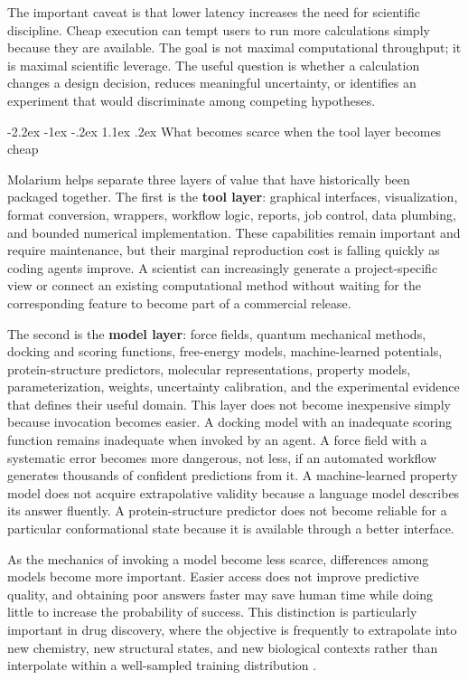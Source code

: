 \documentclass[11pt]{article}
\makeatletter
\renewcommand\section{\@startsection{section}{1}{\z@}%
  {-2.2ex \@plus -1ex \@minus -.2ex}%
  {1.1ex \@plus .2ex}%
  {\normalfont\Large\bfseries\color{molblue}}}
\makeatother
\begin{document}
The important caveat is that lower latency increases the need for scientific discipline. Cheap execution can tempt users to run more calculations simply because they are available. The goal is not maximal computational throughput; it is maximal scientific leverage. The useful question is whether a calculation changes a design decision, reduces meaningful uncertainty, or identifies an experiment that would discriminate among competing hypotheses.

\section{What becomes scarce when the tool layer becomes cheap}

Molarium helps separate three layers of value that have historically been packaged together. The first is the \textbf{tool layer}: graphical interfaces, visualization, format conversion, wrappers, workflow logic, reports, job control, data plumbing, and bounded numerical implementation. These capabilities remain important and require maintenance, but their marginal reproduction cost is falling quickly as coding agents improve. A scientist can increasingly generate a project-specific view or connect an existing computational method without waiting for the corresponding feature to become part of a commercial release.

The second is the \textbf{model layer}: force fields, quantum mechanical methods, docking and scoring functions, free-energy models, machine-learned potentials, protein-structure predictors, molecular representations, property models, parameterization, weights, uncertainty calibration, and the experimental evidence that defines their useful domain. This layer does not become inexpensive simply because invocation becomes easier. A docking model with an inadequate scoring function remains inadequate when invoked by an agent. A force field with a systematic error becomes more dangerous, not less, if an automated workflow generates thousands of confident predictions from it. A machine-learned property model does not acquire extrapolative validity because a language model describes its answer fluently. A protein-structure predictor does not become reliable for a particular conformational state because it is available through a better interface.

As the mechanics of invoking a model become less scarce, differences among models become more important. Easier access does not improve predictive quality, and obtaining poor answers faster may save human time while doing little to increase the probability of success. This distinction is particularly important in drug discovery, where the objective is frequently to extrapolate into new chemistry, new structural states, and new biological contexts rather than interpolate within a well-sampled training distribution \citep{bender2021realistic1,bender2021realistic2,wigh2022representations}.
\end{document}
